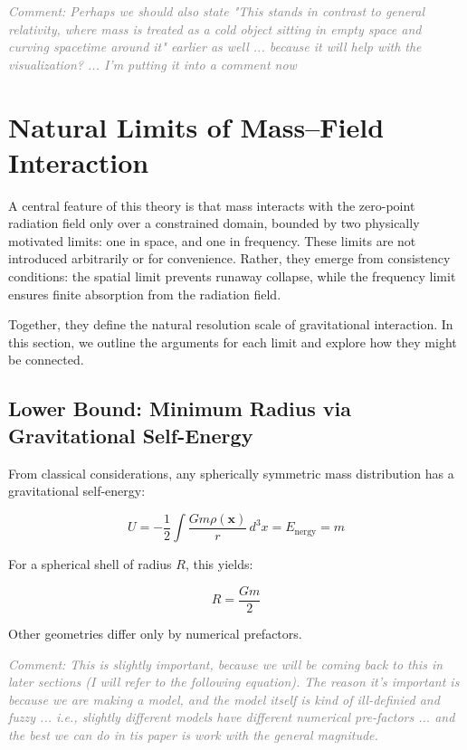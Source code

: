 \documentclass {article}
\renewcommand\vec{\mathbf}
\newcommand{\comment}[1]{\textcolor{gray}{\small\textit{Comment: #1}}}
\begin{document}
\comment{Perhaps we should also state "This stands in contrast to general relativity, where mass is treated as a cold object sitting in empty space and curving spacetime around it" earlier as well ... because it will help with the visualization?  ... I'm putting it into a comment now}




\section{Natural Limits of Mass–Field Interaction}

A central feature of this theory is that mass interacts with the zero-point radiation field only over a constrained domain, bounded by two physically motivated limits: one in space, and one in frequency. These limits are not introduced arbitrarily or for convenience. Rather, they emerge from consistency conditions: the spatial limit prevents runaway collapse, while the frequency limit ensures finite absorption from the radiation field.

Together, they define the natural resolution scale of gravitational interaction. In this section, we outline the arguments for each limit and explore how they might be connected.


\subsection{Lower Bound: Minimum Radius via Gravitational Self-Energy}

From classical considerations, any spherically symmetric mass distribution has a gravitational self-energy:


\begin{equation}
U = -\frac{1}{2} \int \frac{G m \rho(\vec{x})}{r} \, d^3x = E_{\text{nergy}} = m
\end{equation}

For a spherical shell of radius \( R \), this yields:


\begin{equation}
R = \frac{G m}{2}
\end{equation}

Other geometries differ only by numerical prefactors. 

\comment{This is slightly important, because we will be coming back to this in later sections (I will refer to the following equation). The reason it's important is because we are making a model, and the model itself is kind of  ill-definied and fuzzy ... i.e., slightly  different models have different numerical pre-factors ... and the best we can do in tis paper is work with the general magnitude.}
\end{document}
